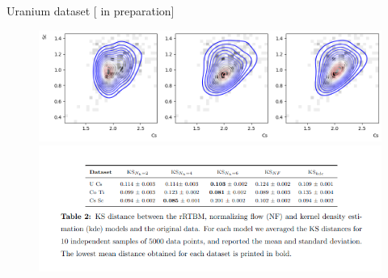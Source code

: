 \documentclass[10pt]{beamer}
\begin{document}
\begin{frame}{Uranium dataset \hfill \small [\cite{new} in preparation]}

    \begin{figure}
        \includegraphics[width=\textwidth]{figures/uranium2.png}
        \centering
        \includegraphics[scale=0.6]{figures/KS.png}
    \end{figure}
    
    
\end{frame}
\end{document}
